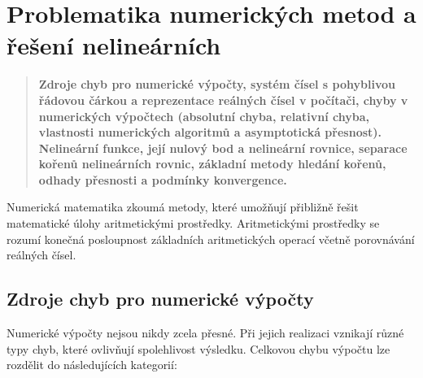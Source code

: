 \newpage
\section{Problematika numerických metod a řešení nelineárních } 
\begin{quote}
    \textbf{Zdroje chyb pro numerické výpočty, systém čísel s pohyblivou řádovou čárkou a reprezentace reálných čísel v počítači, chyby v numerických výpočtech (absolutní chyba, relativní chyba, vlastnosti numerických algoritmů a asymptotická přesnost). Nelineární funkce, její nulový bod a nelineární rovnice, separace kořenů nelineárních rovnic, základní metody hledání kořenů, odhady přesnosti a podmínky konvergence.}
\end{quote}
Numerická matematika zkoumá metody, které umožňují přibližně řešit
matematické úlohy aritmetickými prostředky. Aritmetickými prostředky se rozumí 
konečná posloupnost základních aritmetických
operací včetně porovnávání reálných čísel.

\subsection{Zdroje chyb pro numerické výpočty}
Numerické výpočty nejsou nikdy zcela přesné. Při jejich realizaci vznikají různé typy chyb, které ovlivňují spolehlivost výsledku. Celkovou chybu výpočtu lze rozdělit do následujících kategorií:

